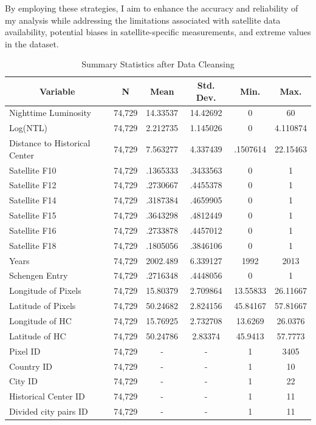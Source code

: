\documentclass[12pt]{article}    %
\begin{document}
\par By employing these strategies, I aim to enhance the accuracy and reliability of my analysis while addressing the limitations associated with satellite data availability, potential biases in satellite-specific measurements, and extreme values in the dataset.


\newpage
\begin{table}[H] \hypertarget{Table 2.A.1}{}
\renewcommand\thetable{2.A.1}
\centering \caption{Summary Statistics after Data Cleansing}
\begin{tabular}{l c c c c c}\hline\hline
\multicolumn{1}{c}{\textbf{Variable}} & \textbf{N}
 & \textbf{Mean}& \textbf{Std. Dev.} &  \textbf{Min.} & \textbf{Max.}\\ \hline
Nighttime Luminosity      & 74,729 & 14.33537 & 14.42692 & 0         & 60       \\
Log(NTL)             & 74,729 & 2.212735 & 1.145026 & 0         & 4.110874 \\
Distance to Historical Center                 & 74,729 & 7.563277 & 4.337439 & .1507614  & 22.15463 \\
Satellite F10                  & 74,729 & .1365333 & .3433563 & 0         & 1        \\
Satellite F12                  & 74,729 & .2730667 & .4455378 & 0         & 1        \\
Satellite F14                  & 74,729 & .3187384 & .4659905 & 0         & 1        \\
Satellite F15                  & 74,729 & .3643298 & .4812449 & 0         & 1        \\
Satellite F16                  & 74,729 & .2733878 & .4457012 & 0         & 1        \\
Satellite F18                  & 74,729 & .1805056 & .3846106 & 0         & 1        \\
Years                 & 74,729 & 2002.489 & 6.339127 & 1992      & 2013     \\
Schengen Entry              & 74,729 & .2716348 & .4448056 & 0         & 1        \\
Longitude of Pixels                    & 74,729 & 15.80379 & 2.709864 & 13.55833  & 26.11667 \\
Latitude of Pixels                    & 74,729 & 50.24682 & 2.824156 & 45.84167  & 57.81667 \\
Longitude of HC               & 74,729 & 15.76925 & 2.732708 & 13.6269   & 26.0376  \\
Latitude of HC              & 74,729 & 50.24786 & 2.83374  & 45.9413   & 57.7773  \\
Pixel ID                   & 74,729 &  -& - & 1         &   3405    \\
Country ID  & 74,729 & - & - & 1         & 10       \\
City ID   & 74,729 & - & -  & 1         & 22       \\ 
Historical Center ID              & 74,729 &  - &- & 1         &  11  \\
Divided city pairs  ID               & 74,729 &  - &-  & 1         & 11       \\
\hline
\hline
\end{tabular}
\end{table}
\end{document}

